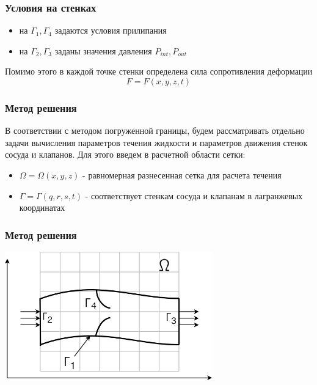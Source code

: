 \documentclass[14pt]{beamer}
\begin{document}
\begin{frame}
\frametitle{Условия на стенках}
\begin{itemize}
    \item на $\Gamma_1,\Gamma_4$ задаются условия прилипания
    \item на $\Gamma_2,\Gamma_3$ заданы значения давления $P_{int},P_{out}$
\end{itemize}

Помимо этого в каждой точке стенки определена сила сопротивления деформации
\begin{equation*}
    \label{eq:define_boundary_force}
    F = F(x, y, z, t)
\end{equation*}

\end{frame}

\begin{frame}
\frametitle{Метод решения}
В соответствии с методом погруженной границы, будем рассматривать отдельно задачи вычисления параметров течения жидкости и параметров движения стенок сосуда и клапанов. Для этого введем в расчетной области сетки:
\begin{itemize}
    \item $\Omega = \Omega(x, y, z)$ - равномерная разнесенная сетка для расчета течения
    \item $\Gamma = \Gamma(q, r, s, t)$ - соответствует стенкам сосуда и клапанам в лагранжевых координатах
\end{itemize}

\end{frame}

\begin{frame}
\frametitle{Метод решения}
    \begin{center}
        \includegraphics[width=9cm]{area_ibm.png}
    \end{center}
\end{frame}
\end{document}
